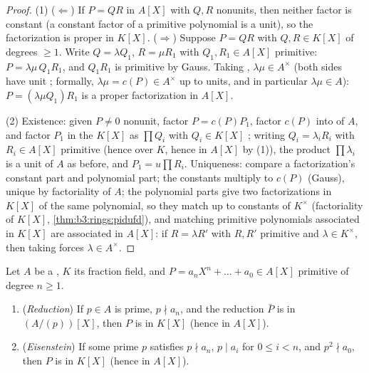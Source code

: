 \begin{proof}
(1) ($\Leftarrow$) If $P = QR$ in $A[X]$ with $Q, R$ nonunits,
then neither factor is constant (a constant factor of a primitive
polynomial is a unit), so the factorization is proper in $K[X]$.
($\Rightarrow$) Suppose $P = QR$ with $Q, R \in K[X]$ of degrees
$\geq 1$. Write $Q = \lambda Q_1$, $R = \mu R_1$ with $Q_1, R_1
\in A[X]$ primitive: $P = \lambda\mu\, Q_1R_1$, and $Q_1R_1$ is
primitive by Gauss. Taking , $\lambda\mu \in A^\times$
(both sides have unit ; formally, $\lambda\mu = c(P) \in
A^\times$ up to units, and in particular $\lambda \mu \in A$): $P
= (\lambda\mu Q_1) R_1$ is a proper factorization in $A[X]$.

(2) Existence: given $P \neq 0$ nonunit, factor $P = c(P)P_1$,
factor $c(P)$ into  of $A$, and factor $P_1$ in the
 $K[X]$ as $\prod Q_i$ with $Q_i \in K[X]$ ; writing
$Q_i = \lambda_i R_i$ with $R_i \in A[X]$ primitive (hence
 over $K$, hence in $A[X]$ by (1)), the product
$\prod \lambda_i$ is a unit of $A$ as before, and $P_1 = u\prod
R_i$. Uniqueness: compare a factorization's constant part and
polynomial part; the constants multiply to $c(P)$ (Gauss), unique
by factoriality of $A$; the polynomial parts give two
factorizations in $K[X]$ of the same polynomial, so they match up
to constants of $K^\times$ (factoriality of $K[X]$,
\cref{thm:b3:rings:pidufd}), and matching primitive polynomials
associated in $K[X]$ are associated in $A[X]$: if $R = \lambda R'$
with $R, R'$ primitive and $\lambda \in K^\times$, then taking
 forces $\lambda \in A^\times$.
\end{proof}

\begin{theorem}\label{thm:b3:rings:criteria}
Let $A$ be a , $K$ its fraction field, and $P = a_nX^n + \dots
+ a_0 \in A[X]$ primitive of degree $n \geq 1$.
\begin{enumerate}
  \item (\emph{Reduction}) If $p \in A$ is prime, $p \nmid a_n$,
        and the reduction $\bar P$ is  in
        $(A/(p))[X]$, then $P$ is  in $K[X]$ (hence in
        $A[X]$).
  \item (\emph{Eisenstein}) If some
        prime $p$ satisfies $p \nmid a_n$, $p \mid a_i$ for $0
        \leq i < n$, and $p^2 \nmid a_0$, then $P$ is 
        in $K[X]$ (hence in $A[X]$).
\end{enumerate}
\end{theorem}

